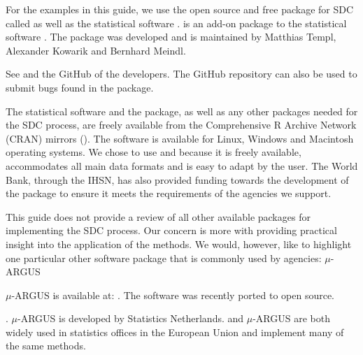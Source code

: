 \documentclass[letterpaper,10pt,english]{sphinxmanual}
\begin{document}
For the examples in this guide, we use the open source and free package
for SDC called  as well as the statistical software .
 is an add-on package to the statistical software . The
package was developed and is maintained by Matthias Templ, Alexander
Kowarik and Bernhard Meindl. %
\begin{footnote}[2]\sphinxAtStartFootnote
See  and the GitHub
 of the developers. The
GitHub repository can also be used to submit bugs found in the package.
%
\end{footnote} The statistical software  and the 
package, as well as any other packages needed for the SDC process, are
freely available from the Comprehensive R Archive Network (CRAN) mirrors
(). The software is available for Linux,
Windows and Macintosh operating systems. We chose to use  and
 because it is freely available, accommodates all main data
formats and is easy to adapt by the user. The World Bank, through the
IHSN, has also provided funding towards the development of the
 package to ensure it meets the requirements of the agencies
we support.

This guide does not provide a review of all other available packages for
implementing the SDC process. Our concern is more with providing
practical insight into the application of the methods. We would,
however, like to highlight one particular other software package that is
commonly used by agencies: \(\mu\)-ARGUS %
\begin{footnote}[3]\sphinxAtStartFootnote
\(\mu\)-ARGUS is available at: . The
software was recently ported to open source.
%
\end{footnote}. \(\mu\)-ARGUS is
developed by Statistics Netherlands.  and \(\mu\)-ARGUS are both
widely used in statistics offices in the European Union and implement
many of the same methods.
\end{document}
